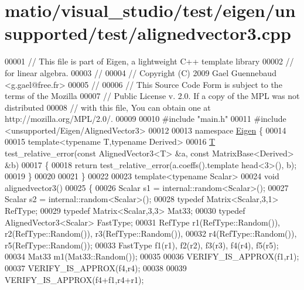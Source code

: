 \hypertarget{matio_2visual__studio_2test_2eigen_2unsupported_2test_2alignedvector3_8cpp_source}{}\section{matio/visual\+\_\+studio/test/eigen/unsupported/test/alignedvector3.cpp}
\label{matio_2visual__studio_2test_2eigen_2unsupported_2test_2alignedvector3_8cpp_source}

\begin{DoxyCode}
00001 \textcolor{comment}{// This file is part of Eigen, a lightweight C++ template library}
00002 \textcolor{comment}{// for linear algebra.}
00003 \textcolor{comment}{//}
00004 \textcolor{comment}{// Copyright (C) 2009 Gael Guennebaud <g.gael@free.fr>}
00005 \textcolor{comment}{//}
00006 \textcolor{comment}{// This Source Code Form is subject to the terms of the Mozilla}
00007 \textcolor{comment}{// Public License v. 2.0. If a copy of the MPL was not distributed}
00008 \textcolor{comment}{// with this file, You can obtain one at http://mozilla.org/MPL/2.0/.}
00009 
00010 \textcolor{preprocessor}{#include "main.h"}
00011 \textcolor{preprocessor}{#include <unsupported/Eigen/AlignedVector3>}
00012 
00013 \textcolor{keyword}{namespace }\hyperlink{namespace_eigen}{Eigen} \{
00014 
00015 \textcolor{keyword}{template}<\textcolor{keyword}{typename} T,\textcolor{keyword}{typename} Derived>
00016 \hyperlink{group___sparse_core___module_class_eigen_1_1_triplet}{T} test\_relative\_error(\textcolor{keyword}{const} AlignedVector3<T> &a, \textcolor{keyword}{const} MatrixBase<Derived> &b)
00017 \{
00018   \textcolor{keywordflow}{return} test\_relative\_error(a.coeffs().template head<3>(), b);
00019 \}
00020 
00021 \}
00022 
00023 \textcolor{keyword}{template}<\textcolor{keyword}{typename} Scalar>
00024 \textcolor{keywordtype}{void} alignedvector3()
00025 \{
00026   Scalar s1 = internal::random<Scalar>();
00027   Scalar s2 = internal::random<Scalar>();
00028   \textcolor{keyword}{typedef} Matrix<Scalar,3,1> RefType;
00029   \textcolor{keyword}{typedef} Matrix<Scalar,3,3> Mat33;
00030   \textcolor{keyword}{typedef} AlignedVector3<Scalar> FastType;
00031   RefType  r1(RefType::Random()), r2(RefType::Random()), r3(RefType::Random()),
00032            r4(RefType::Random()), r5(RefType::Random());
00033   FastType f1(r1), f2(r2), f3(r3), f4(r4), f5(r5);
00034   Mat33 m1(Mat33::Random());
00035   
00036   VERIFY\_IS\_APPROX(f1,r1);
00037   VERIFY\_IS\_APPROX(f4,r4);
00038 
00039   VERIFY\_IS\_APPROX(f4+f1,r4+r1);

\end{DoxyCode}
